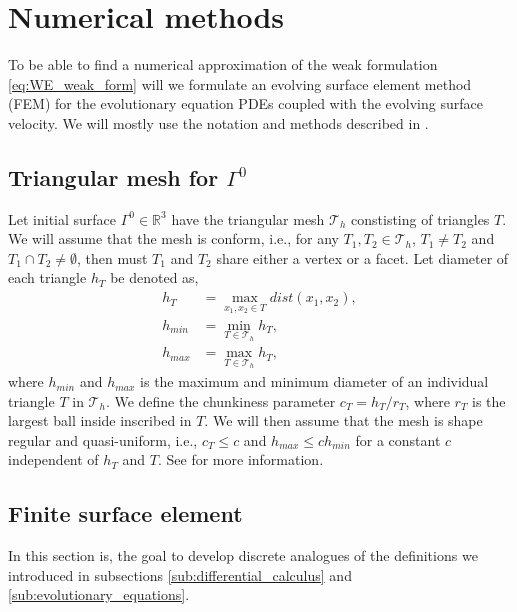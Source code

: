 
\section{Numerical methods}%
\label{sec:numerical_methods}


 To be able to find a numerical approximation of the weak formulation \eqref{eq:WE_weak_form} will we formulate an evolving surface element method (FEM) for the evolutionary equation PDEs coupled with the evolving surface velocity. We will mostly
 use the notation and methods described in \cite{kovacs2021convergent, hu2022evolving}.

\subsection{ Triangular mesh for $\Gamma ^{0}$  }%
\label{sub:triangular_mesh}

Let initial surface $\Gamma ^{0} \in  \mathbb{R} ^3$ have the triangular mesh $\mathcal{T}_{h} $ constisting of triangles $T$. We will assume that the mesh is conform, i.e., for any $T_{1}, T_{2} \in \mathcal{T}_h$,  $T_{1} \neq T_{2}$ and $T_{1} \cap T_{2} \neq \emptyset
$, then must $T_{1}$  and $T_{2}$ share either a vertex or a facet. Let diameter of each triangle $h_{T}$  be denoted as,
\[
    \begin{split}
    h_{T} & = \max_{x_{1}, x_{2} \in T} dist(x_{1}, x_{2}), \\
h_{min} & = \min_{T \in \mathcal{T} _{h}} h_{T}, \\
h_{max} & = \max_{T \in \mathcal{T} _{h}} h_{T},
    \end{split}
\]
where $h_{min}$ and $h_{max}$ is the maximum and minimum diameter of an individual triangle $T$ in $\mathcal{T}_{h} $. We define the chunkiness parameter $c_{T} = h_{T}/r_{T}$, where $r_{T}$ is the largest ball inside inscribed in $T$. We will then
assume that the mesh is shape regular and quasi-uniform, i.e., $c_{T} \le c $ and $h_{max} \le c h_{min} $ for a  constant $c$ independent of $h_{T} $ and $T$.
See \cite[Section 4.1]{dziuk2013finite} for more information.


\subsection{Finite surface element}%
\label{sub:surface_element_method}
In this section is, the goal to develop discrete analogues of the definitions we introduced in subsections \ref{sub:differential_calculus} and \ref{sub:evolutionary_equations}.


